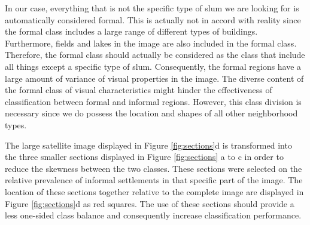 In our case, everything that is not the specific type of slum we are looking for is automatically considered formal. This is actually not in accord with reality since the formal class includes a large range of different types of buildings. Furthermore, fields and lakes in the image are also included in the formal class. Therefore, the formal class should actually be considered as the class that include all things except a specific type of slum. Consequently, the formal regions have a large amount of variance of visual properties in the image. The diverse content of the formal class of visual characteristics might hinder the effectiveness of classification between formal and informal regions. However, this class division is necessary since we do possess the location and shapes of all other neighborhood types.

The large satellite image displayed in Figure \ref{fig:sections}d is transformed into the three smaller sections displayed in Figure \ref{fig:sections} a to c in order to reduce the skewness between the two classes. These sections were selected on the relative prevalence of informal settlements in that specific part of the image. The location of these sections together relative to the complete image are displayed in Figure \ref{fig:sections}d as red squares. The use of these sections should provide a less one-sided class balance and consequently increase classification performance. 



